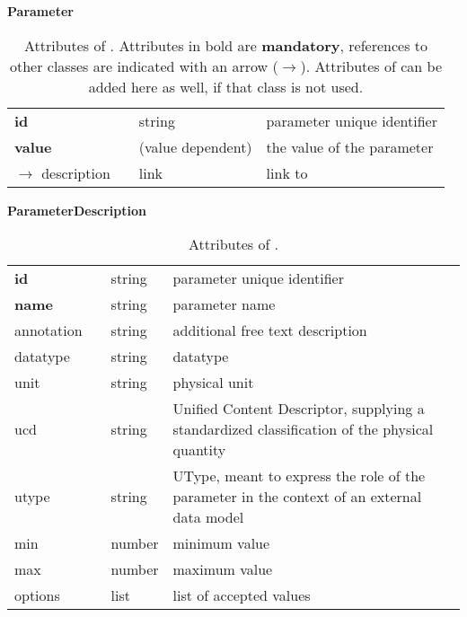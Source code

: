 \begin{table}[h]
\small
{}\textwidth
\textbf{\normalsize Parameter}\vspace{0.25em}\\
\begin{tabulary}{1.0\textwidth}{@{}p{2.5cm}p{0cm}lL@{}}
\toprule
{} & \head{} &  & \\
\midrule
\textbf{id}      & & string & parameter unique identifier\\
\textbf{value}   & & (value dependent) & the value of the parameter\\
\midrule
$\rightarrow$ description & & link & link to \\
\bottomrule
\end{tabulary}
\caption[Attributes of ]{Attributes of . Attributes in bold are \textbf{mandatory}, references to other classes are indicated with an arrow ($\rightarrow$). Attributes of  can be added here as well, if that class is not used.}
\end{table}

\begin{table}[ht]
\small
{}\textwidth
\textbf{\normalsize ParameterDescription}\vspace{0.25em}\\
\begin{tabulary}{1.0\textwidth}{@{}p{0cm}p{2.5cm}lL@{}}
\toprule
{} & \head{} &  & \\
\midrule
\textbf{id}  & & string & parameter unique identifier\\
\textbf{name} & & string & parameter name\\
annotation & & string & additional free text description\\
datatype    & & string & datatype \\
unit           & & string & physical unit \\
ucd           & & string  & Unified Content Descriptor, supplying a standardized classification of the physical quantity\\
utype        & & string  & UType, meant to express the role of the parameter in the context of an external data model \\
min           & & number & minimum value \\
max           & & number & maximum value\\
options           & & list & list of accepted values\\
\bottomrule
\end{tabulary}
\caption[Attributes of ]{Attributes of .}
\end{table}

